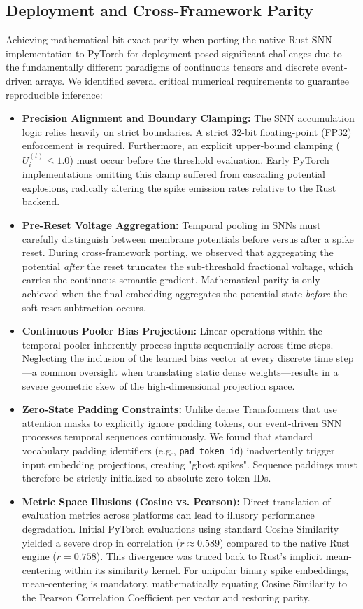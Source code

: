 \documentclass{article} %
\begin{document}
\subsection{Deployment and Cross-Framework Parity}
Achieving mathematical bit-exact parity when porting the native Rust SNN implementation to PyTorch for deployment posed significant challenges due to the fundamentally different paradigms of continuous tensors and discrete event-driven arrays. We identified several critical numerical requirements to guarantee reproducible inference:
\begin{itemize}
    \item \textbf{Precision Alignment and Boundary Clamping:} The SNN accumulation logic relies heavily on strict boundaries. A strict 32-bit floating-point (FP32) enforcement is required. Furthermore, an explicit upper-bound clamping ($U_i^{(t)} \le 1.0$) must occur before the threshold evaluation. Early PyTorch implementations omitting this clamp suffered from cascading potential explosions, radically altering the spike emission rates relative to the Rust backend.
    \item \textbf{Pre-Reset Voltage Aggregation:} Temporal pooling in SNNs must carefully distinguish between membrane potentials before versus after a spike reset. During cross-framework porting, we observed that aggregating the potential \textit{after} the reset truncates the sub-threshold fractional voltage, which carries the continuous semantic gradient. Mathematical parity is only achieved when the final embedding aggregates the potential state \textit{before} the soft-reset subtraction occurs.
    \item \textbf{Continuous Pooler Bias Projection:} Linear operations within the temporal pooler inherently process inputs sequentially across time steps. Neglecting the inclusion of the learned bias vector at every discrete time step—a common oversight when translating static dense weights—results in a severe geometric skew of the high-dimensional projection space.
    \item \textbf{Zero-State Padding Constraints:} Unlike dense Transformers that use attention masks to explicitly ignore padding tokens, our event-driven SNN processes temporal sequences continuously. We found that standard vocabulary padding identifiers (e.g., \texttt{pad\_token\_id}) inadvertently trigger input embedding projections, creating "ghost spikes". Sequence paddings must therefore be strictly initialized to absolute zero token IDs.
    \item \textbf{Metric Space Illusions (Cosine vs. Pearson):} Direct translation of evaluation metrics across platforms can lead to illusory performance degradation. Initial PyTorch evaluations using standard Cosine Similarity yielded a severe drop in correlation ($r \approx 0.589$) compared to the native Rust engine ($r = 0.758$). This divergence was traced back to Rust's implicit mean-centering within its similarity kernel. For unipolar binary spike embeddings, mean-centering is mandatory, mathematically equating Cosine Similarity to the Pearson Correlation Coefficient per vector and restoring parity.
\end{itemize}
\end{document}

